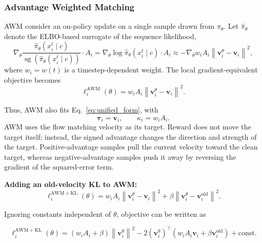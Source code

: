 \documentclass{article} %
\begin{document}
\subsubsection{Advantage Weighted Matching}
\label{sec:awm}

AWM  consider an on-policy update on a single sample drawn from
$\pi_{\theta}$. Let $\widehat{\pi}_{\theta}$ denote the ELBO-based surrogate of the sequence likelihood,
\begin{equation}
\nabla_{\theta}
\frac{\hat{\pi}_{\theta}(x_i^t \mid c)}
{\operatorname{sg}\left(\hat{\pi}_{\theta}(x_i^t \mid c)\right)}
\cdot A_i
=
\nabla_{\theta}\log \hat{\pi}_{\theta}(x_i^t \mid c)\cdot A_i
\approx
-\nabla_{\theta}
w_i  A_i
\left\|
\mathbf{v}^{\theta}_i-\mathbf{v}_i
\right\|^2,
\end{equation}
where $w_i=w(t)$ is a timestep-dependent weight. The local gradient-equivalent objective becomes
\begin{equation}
\label{eq:awm_velocity_target_short}
\ell_i^{\mathrm{AWM}}(\theta)
=
w_i A_i
\left\|
\mathbf{v}_i^\theta-\mathbf{v}_i
\right\|^2.
\end{equation}


Thus, AWM also fits Eq.~\ref{eq:unified_form}, with
\begin{equation}
\mathbf{\tau}_i
=
\mathbf{v}_i,
\qquad
\kappa_i
=
w_i A_i.
\end{equation}
AWM uses the flow matching velocity as its target. Reward does not move
the target itself; instead, the signed advantage changes the direction and
strength of the target. 
Positive-advantage samples pull the current
velocity toward the clean target, whereas negative-advantage samples push it
away by reversing the gradient of the squared-error term.



\textbf{Adding an old-velocity KL to AWM:}
\begin{equation}
\ell_i^{\mathrm{AWM+KL}}(\theta)
=
w_iA_i
\left\|
\mathbf{v}_i^\theta-\mathbf{v}_i
\right\|^2
+
\beta
\left\|
\mathbf{v}_i^\theta-\mathbf{v}_i^{\mathrm{old}}
\right\|^2 .
\end{equation}

Ignoring constants independent of $\theta$, objective can
be written as

\begin{equation}
\ell_i^{\mathrm{AWM+KL}}(\theta)
=
(w_iA_i+\beta)
\left\|
\mathbf{v}_i^\theta
\right\|^2
-
2
\left(\mathbf{v}_i^\theta\right)^\top
\left(
w_iA_i\mathbf{v}_i+\beta\mathbf{v}_i^{\mathrm{old}}
\right)
+
\mathrm{const.}
\end{equation}
\end{document}
